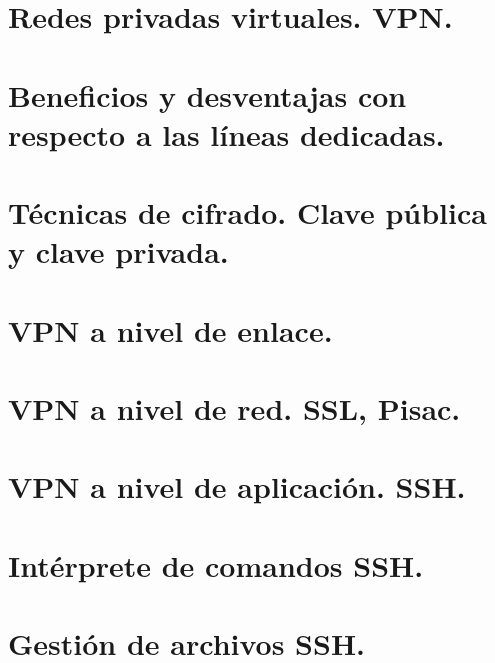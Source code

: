 \documentclass[letterpaper,10pt,spanish]{sphinxmanual}
\begin{document}
\section{Redes privadas virtuales. VPN.}
\label{\detokenize{tema_acceso_remoto/tema_acceso_remoto:redes-privadas-virtuales-vpn}}

\section{Beneficios y desventajas con respecto a las líneas dedicadas.}
\label{\detokenize{tema_acceso_remoto/tema_acceso_remoto:beneficios-y-desventajas-con-respecto-a-las-lineas-dedicadas}}

\section{Técnicas de cifrado. Clave pública y clave privada.}
\label{\detokenize{tema_acceso_remoto/tema_acceso_remoto:tecnicas-de-cifrado-clave-publica-y-clave-privada}}

\section{VPN a nivel de enlace.}
\label{\detokenize{tema_acceso_remoto/tema_acceso_remoto:vpn-a-nivel-de-enlace}}

\section{VPN a nivel de red. SSL, Pisac.}
\label{\detokenize{tema_acceso_remoto/tema_acceso_remoto:vpn-a-nivel-de-red-ssl-pisac}}

\section{VPN a nivel de aplicación. SSH.}
\label{\detokenize{tema_acceso_remoto/tema_acceso_remoto:vpn-a-nivel-de-aplicacion-ssh}}

\section{Intérprete de comandos SSH.}
\label{\detokenize{tema_acceso_remoto/tema_acceso_remoto:interprete-de-comandos-ssh}}

\section{Gestión de archivos SSH.}
\label{\detokenize{tema_acceso_remoto/tema_acceso_remoto:gestion-de-archivos-ssh}}
\end{document}
